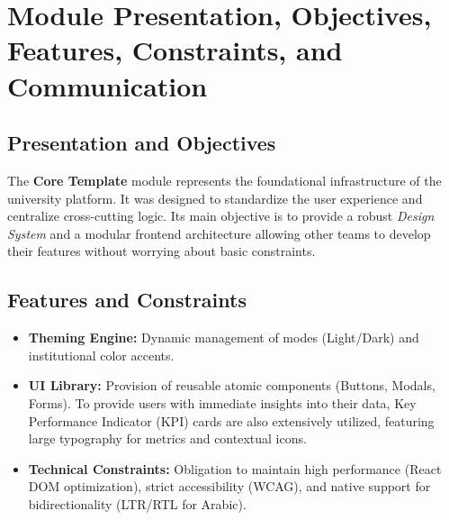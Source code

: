 \documentclass[12pt,a4paper]{report}
\begin{document}
\section{Module Presentation, Objectives, Features, Constraints, and Communication}

\subsection{Presentation and Objectives}
The \textbf{Core Template} module represents the foundational infrastructure of the university platform. It was designed to standardize the user experience and centralize cross-cutting logic. Its main objective is to provide a robust \textit{Design System} and a modular frontend architecture allowing other teams to develop their features without worrying about basic constraints.

\subsection{Features and Constraints}
\begin{itemize}
    \item \textbf{Theming Engine:} Dynamic management of modes (Light/Dark) and institutional color accents.
    \item \textbf{UI Library:} Provision of reusable atomic components (Buttons, Modals, Forms). To provide users with immediate insights into their data, Key Performance Indicator (KPI) cards are also extensively utilized, featuring large typography for metrics and contextual icons.
    \item \textbf{Technical Constraints:} Obligation to maintain high performance (React DOM optimization), strict accessibility (WCAG), and native support for bidirectionality (LTR/RTL for Arabic).
\end{itemize}
\end{document}
